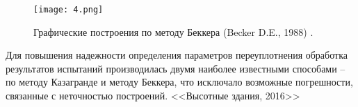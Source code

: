 \begin{figure}[ht]
  \centering
  \label{eq:beck}
  \texttt{[image: 4.png]}
  \caption{Графические построения по методу Беккера (Becker D.E., 1988) \cite{becker1988}.}
\end{figure}


Для повышения надежности определения параметров переуплотнения обработка результатов испытаний производилась двумя наиболее известными способами – по методу Казагранде и методу Беккера, что исключало возможные погрешности, связанные с неточностью построений. <<Высотные здания, 2016>>
